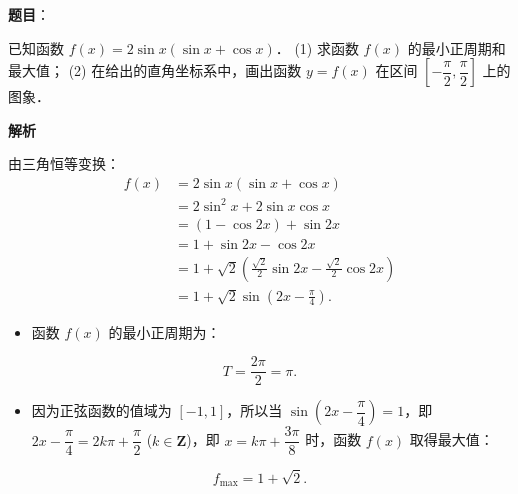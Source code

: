 \begin{answer}

\textbf{题目}：

已知函数 $f(x) = 2\sin x(\sin x + \cos x)$．
(1) 求函数 $f(x)$ 的最小正周期和最大值；
(2) 在给出的直角坐标系中，画出函数 $y = f(x)$ 在区间 $\left[-\dfrac{\pi}{2}, \dfrac{\pi}{2}\right]$ 上的图象．
\nopagebreak[4]
\begin{center}\end{center}
\nopagebreak[4]
\textbf{解析}

由三角恒等变换：
\nopagebreak[4]
\[\begin{aligned}
f(x) &= 2\sin x(\sin x + \cos x) \\
&= 2\sin^2 x + 2\sin x\cos x \\
&= (1 - \cos 2x) + \sin 2x \\
&= 1 + \sin 2x - \cos 2x \\
&= 1 + \sqrt{2}\left(\frac{\sqrt{2}}{2}\sin 2x - \frac{\sqrt{2}}{2}\cos 2x\right) \\
&= 1 + \sqrt{2}\sin\left(2x - \frac{\pi}{4}\right).
\end{aligned}\]


\begin{itemize}
\item 函数 $f(x)$ 的最小正周期为：
\end{itemize}
\nopagebreak[4]
\[T = \frac{2\pi}{2} = \pi.\]
\begin{itemize}
\item 因为正弦函数的值域为 $[-1, 1]$，所以当 $\sin\left(2x - \dfrac{\pi}{4}\right) = 1$，即 $2x - \dfrac{\pi}{4} = 2k\pi + \dfrac{\pi}{2}$ ($k \in \mathbf{Z}$)，即 $x = k\pi + \dfrac{3\pi}{8}$ 时，函数 $f(x)$ 取得最大值：
\end{itemize}
\nopagebreak[4]
\[f_{\max} = 1 + \sqrt{2}.\]


\end{answer}
